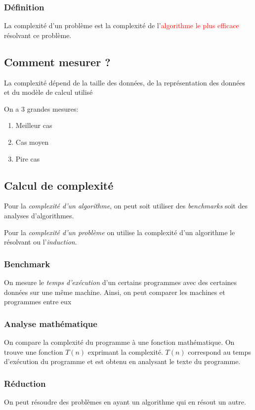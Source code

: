 \documentclass{report}
\begin{document}
\subsubsection{Définition}
La complexité d'un problème est la complexité de l'\textcolor{red}{algorithme le plus efficace} résolvant ce problème.

\subsection{Comment mesurer ?}
La complexité dépend de la taille des données, de la représentation des données et du modèle de calcul utilisé \par
On a 3 grandes mesures:
\begin{enumerate}
\item Meilleur cas
\item Cas moyen
\item Pire cas
\end{enumerate}

\subsection{Calcul de complexité}
Pour la \textit{complexité d'un algorithme}, on peut soit utiliser des \textit{benchmarks} soit des analyses d'algorithmes.\par
Pour la \textit{complexité d'un problème} on utilise la complexité d'un algorithme le résolvant ou l'\textit{induction}.

\subsubsection{Benchmark}
On mesure le \textit{temps d'exécution} d'un certains programmes avec des certaines données sur une même machine. Ainsi, on peut comparer les machines et programmes entre eux

\subsubsection{Analyse mathématique}
On compare la complexité du programme à une fonction mathématique. On trouve une fonction $T(n)$ exprimant la complexité. $T(n)$ correspond au temps d'exécution du programme et est obtenu en analysant le texte du programme.

\subsubsection{Réduction}
On peut résoudre des problèmes en ayant un algorithme qui en résout un autre.
\end{document}

